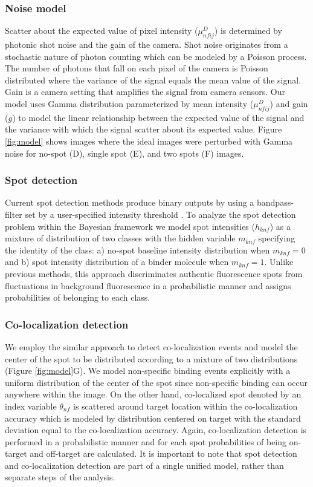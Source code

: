 \subsubsection{Noise model}

Scatter about the expected value of pixel intensity ($\mu^D_{nfij}$) is determined by photonic shot noise and the gain of the camera. Shot noise originates from a stochastic nature of photon counting which can be modeled by a Poisson process. The number of photons that fall on each pixel of the camera is Poisson distributed where the variance of the signal equals the mean value of the signal. Gain is a camera setting that amplifies the signal from camera sensors. Our model uses Gamma distribution parameterized by mean intensity ($\mu^D_{nfij}$) and gain ($g$) to model the linear relationship between the expected value of the signal and the variance with which the signal scatter about its expected value. Figure \ref{fig:model}  shows images  where the ideal images were perturbed with Gamma noise for no-spot (D), single spot (E), and two spots (F) images.

\subsubsection{Spot detection}

Current spot detection methods produce binary outputs by using a bandpass-filter set by a user-specified intensity threshold \citep{Friedman2015-nx, Smith2019-yb}. To analyze the spot detection problem within the Bayesian framework we model spot intensities ($h_{knf}$) as a mixture of distribution of two classes with the hidden variable $m_{knf}$ specifying the identity of the class: a) no-spot baseline intensity distribution when $m_{knf}=0$ and b) spot intensity distribution of a binder molecule when $m_{knf}=1$. Unlike previous methods, this approach discriminates authentic fluorescence spots from fluctuations in background fluorescence in a probabilistic manner and assigns probabilities of belonging to each class.

\subsubsection{Co-localization detection}

We employ the similar approach to detect co-localization events and model the center of the spot to be distributed according to a mixture of two distributions (Figure \ref{fig:model}G). We model non-specific binding events explicitly with a uniform distribution of the center of the spot since non-specific binding can occur anywhere within the image. On the other hand, co-localized spot denoted by an index variable $\theta_{nf}$ is scattered around target location within the co-localization accuracy which is modeled by distribution centered on target with the standard deviation equal to the co-localization accuracy. Again, co-localization detection is performed in a probabilistic manner and for each spot probabilities of being on-target and off-target are calculated. It is important to note that spot detection and co-localization detection are part of a single unified model, rather than separate steps of the analysis.

